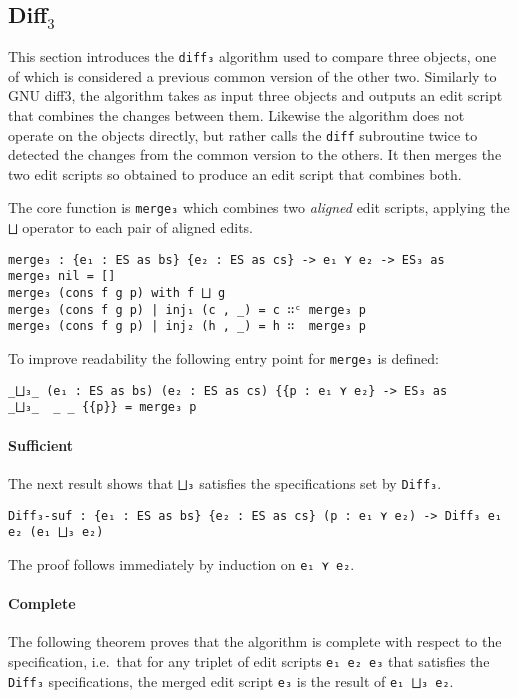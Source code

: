\documentclass[../Thesis.tex]{subfiles}
\begin{document}
	\subsection{Diff$_3$}
	\label{subsec:diff3}	
	This section introduces the \texttt{diff₃} algorithm used to compare 
	three objects, one of which is considered a previous common version
	of the other two.
	Similarly to GNU diff3, the algorithm takes as input three objects
	and outputs an edit script that combines the changes between them.
	Likewise the algorithm does not operate on the objects directly,
	but rather calls the \texttt{diff} subroutine twice to detected the changes 
	from the common version to the others.
	It then merges the two edit scripts so obtained to produce an edit script
	that combines both.
	
	The core function is \texttt{merge₃} which combines two 
	\emph{aligned} edit scripts, applying the \texttt{⨆} operator to
	each pair of aligned edits. 
\begin{verbatim}
merge₃ : {e₁ : ES as bs} {e₂ : ES as cs} -> e₁ ⋎ e₂ -> ES₃ as
merge₃ nil = []
merge₃ (cons f g p) with f ⨆ g
merge₃ (cons f g p) | inj₁ (c , _) = c ∷ᶜ merge₃ p
merge₃ (cons f g p) | inj₂ (h , _) = h ∷  merge₃ p
\end{verbatim}
	
	To improve readability the following entry point for \texttt{merge₃} is
	defined:
\begin{verbatim}
_⨆₃_ (e₁ : ES as bs) (e₂ : ES as cs) {{p : e₁ ⋎ e₂} -> ES₃ as
_⨆₃_  _ _ {{p}} = merge₃ p
\end{verbatim}
	
	\paragraph{Sufficient}
	The next result shows that \texttt{⨆₃} satisfies
	the specifications set by \texttt{Diff₃}.
	
\begin{verbatim}
Diff₃-suf : {e₁ : ES as bs} {e₂ : ES as cs} (p : e₁ ⋎ e₂) -> Diff₃ e₁ e₂ (e₁ ⨆₃ e₂)
\end{verbatim}
	The proof follows immediately by induction 
	on \texttt{e₁ ⋎ e₂}.

	\paragraph{Complete}
	The following theorem proves that the algorithm is
	complete with respect to the specification, i.e.\ that
	for any triplet of edit scripts \texttt{e₁ e₂ e₃} that satisfies 
	the \texttt{Diff₃} specifications, the merged
	edit script \texttt{e₃} is the result of \texttt{e₁ ⨆₃ e₂}.
	
\end{document}
